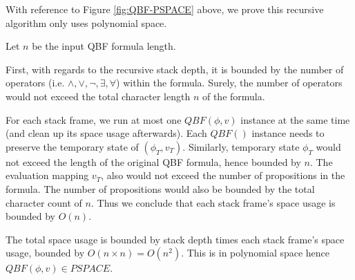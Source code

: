 \documentclass[12pt]{article}
\begin{document}
With reference to Figure \ref{fig:QBF-PSPACE} above, we prove this recursive algorithm only uses polynomial space.

Let $n$ be the input QBF formula length.

First, with regards to the recursive stack depth, it is bounded by the number of operators (i.e. $\land, \lor, \lnot, \exists, \forall$) within the formula. Surely, the number of operators would not exceed the total character length $n$ of the formula.

For each stack frame, we run at most one $QBF(\phi, v)$ instance at the same time (and clean up its space usage afterwards). Each $QBF()$ instance needs to preserve the temporary state of $(\phi_T, v_T)$. Similarly, temporary state $\phi_T$ would not exceed the length of the original QBF formula, hence bounded by $n$. The evaluation mapping $v_T$, also would not exceed the number of propositions in the formula. The number of propositions would also be bounded by the total character count of $n$. Thus we conclude that each stack frame's space usage is bounded by $O(n)$.

The total space usage is bounded by stack depth times each stack frame's space usage, bounded by $O(n \times n) = O(n^2)$. This is in polynomial space hence $QBF(\phi, v) \in PSPACE$.
\end{document}
